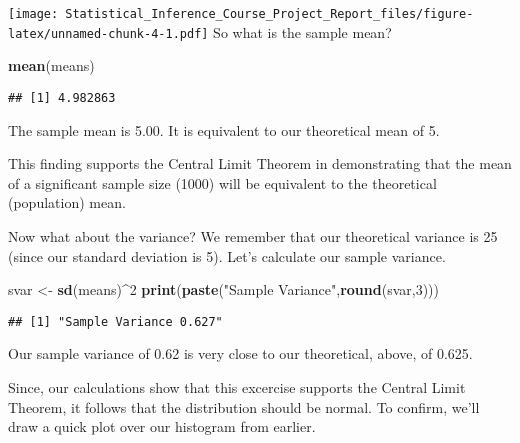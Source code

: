 \documentclass[]{article}
\newenvironment{Shaded}{\begin{snugshade}}{\end{snugshade}}
\newcommand{\KeywordTok}[1]{\textcolor[rgb]{0.13,0.29,0.53}{\textbf{#1}}}
\newcommand{\DecValTok}[1]{\textcolor[rgb]{0.00,0.00,0.81}{#1}}
\newcommand{\StringTok}[1]{\textcolor[rgb]{0.31,0.60,0.02}{#1}}
\newcommand{\OperatorTok}[1]{\textcolor[rgb]{0.81,0.36,0.00}{\textbf{#1}}}
\newcommand{\NormalTok}[1]{#1}
\begin{document}
\texttt{[image: Statistical\_Inference\_Course\_Project\_Report\_files/figure-latex/unnamed-chunk-4-1.pdf]}
So what is the sample mean?

\begin{Shaded}
\begin{Highlighting}[]
\KeywordTok{mean}\NormalTok{(means)}
\end{Highlighting}
\end{Shaded}

\begin{verbatim}
## [1] 4.982863
\end{verbatim}

The sample mean is 5.00. It is equivalent to our theoretical mean of 5.

This finding supports the Central Limit Theorem in demonstrating that
the mean of a significant sample size (1000) will be equivalent to the
theoretical (population) mean.

Now what about the variance? We remember that our theoretical variance
is 25 (since our standard deviation is 5). Let's calculate our sample
variance.

\begin{Shaded}
\begin{Highlighting}[]
\NormalTok{svar <-}\StringTok{ }\KeywordTok{sd}\NormalTok{(means)}\OperatorTok{^}\DecValTok{2}
\KeywordTok{print}\NormalTok{(}\KeywordTok{paste}\NormalTok{(}\StringTok{"Sample Variance"}\NormalTok{,}\KeywordTok{round}\NormalTok{(svar,}\DecValTok{3}\NormalTok{)))}
\end{Highlighting}
\end{Shaded}

\begin{verbatim}
## [1] "Sample Variance 0.627"
\end{verbatim}

Our sample variance of 0.62 is very close to our theoretical, above, of
0.625.

Since, our calculations show that this excercise supports the Central
Limit Theorem, it follows that the distribution should be normal. To
confirm, we'll draw a quick plot over our histogram from earlier.
\end{document}

